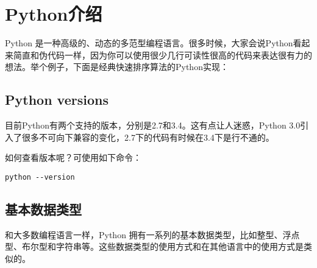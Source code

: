 \section{Python介绍}


Python 是一种高级的、动态的多范型编程语言。很多时候，大家会说Python看起来简直和伪代码一样，因为你可以使用很少几行可读性很高的代码来表达很有力的想法。举个例子，下面是经典快速排序算法的Python实现：



\subsection{Python versions}

%


目前Python有两个支持的版本，分别是2.7和3.4。这有点让人迷惑，Python 3.0引入了很多不可向下兼容的变化，2.7下的代码有时候在3.4下是行不通的。%

如何查看版本呢？可使用如下命令：

\begin{lstlisting}
python --version
\end{lstlisting}



\subsection{基本数据类型}

%
%

和大多数编程语言一样，Python 拥有一系列的基本数据类型，比如整型、浮点型、布尔型和字符串等。这些数据类型的使用方式和在其他语言中的使用方式是类似的。


